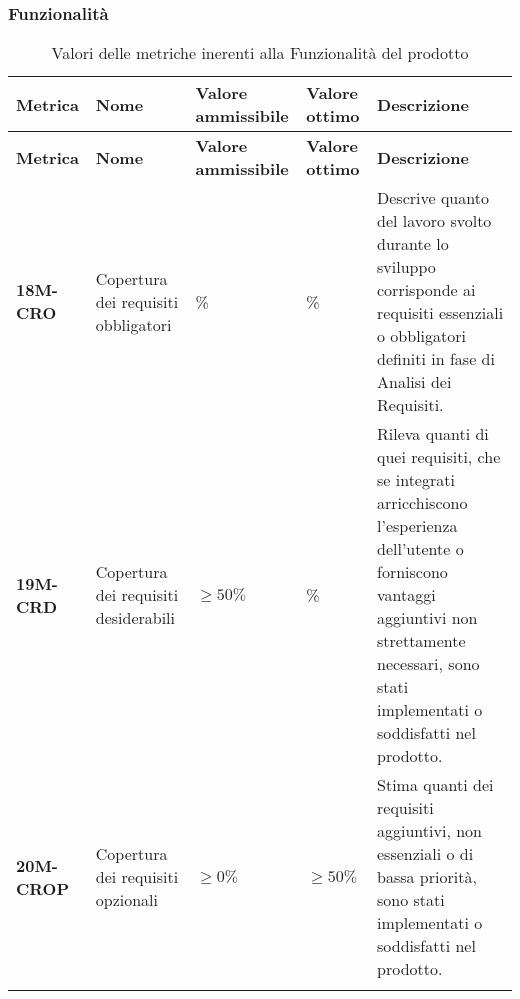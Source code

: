 \subsubsection{Funzionalità}
\begin{longtable}{|>{\centering\arraybackslash}p{}|>{\centering\arraybackslash}p{}|>{\centering\arraybackslash}p{}|>{\centering\arraybackslash}p{}|>{\centering\arraybackslash}p{}|}
    \hline
    \textbf{Metrica} & \textbf{Nome} & \textbf{Valore ammissibile} & \textbf{Valore ottimo}& \textbf{Descrizione}\\
	\hline
    \endfirsthead
    \hline
    \textbf{Metrica} & \textbf{Nome} & \textbf{Valore ammissibile} & \textbf{Valore ottimo}& \textbf{Descrizione}\\
    \endhead
	\textbf{18M-CRO} & Copertura dei requisiti obbligatori & 100\%  & 100\% & Descrive quanto del lavoro svolto durante lo sviluppo corrisponde ai requisiti essenziali o obbligatori definiti in fase di Analisi dei Requisiti.\\
	\hline
	\textbf{19M-CRD} & Copertura dei requisiti desiderabili & $\geq 50\% $  & 100\% & Rileva quanti di quei requisiti, che se integrati arricchiscono l'esperienza dell'utente o forniscono vantaggi aggiuntivi non strettamente necessari, sono stati implementati o soddisfatti nel prodotto.\\ 
	\hline
	\textbf{20M-CROP} & Copertura dei requisiti opzionali & $\geq 0\% $ & $\geq 50\% $ & Stima quanti dei requisiti aggiuntivi, non essenziali o di bassa priorità, sono stati implementati o soddisfatti nel prodotto.\\ 
	\hline
	\caption{ Valori delle metriche inerenti alla Funzionalità del prodotto}
	\label{table:7}
\end{longtable}
